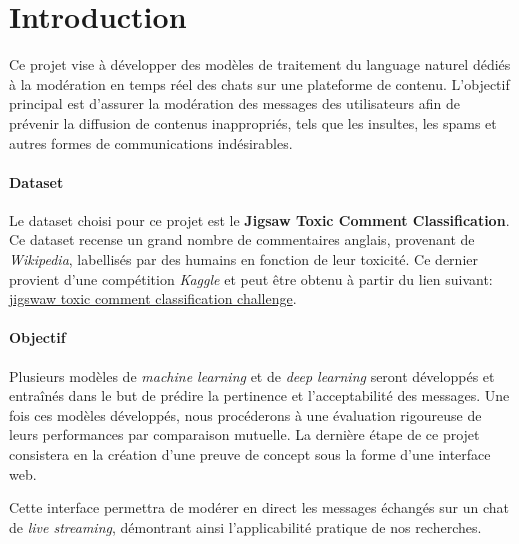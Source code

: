 
\chapter{Introduction}

Ce projet vise à développer des modèles de traitement du language naturel dédiés à la modération en temps réel des chats sur une plateforme de contenu. L'objectif principal est d'assurer la modération des messages des utilisateurs afin de prévenir la diffusion de contenus inappropriés, tels que les insultes, les spams et autres formes de communications indésirables.
\subsubsection*{Dataset} 
Le dataset choisi pour ce projet est le \textbf{Jigsaw Toxic Comment Classification}.
Ce dataset recense un grand nombre de commentaires anglais, provenant de \textit{Wikipedia}, labellisés par des humains en fonction de leur toxicité.
Ce dernier provient d'une compétition \textit{Kaggle} et peut être obtenu à partir du lien suivant: \href{https://www.kaggle.com/competitions/jigsaw-toxic-comment-classification-challenge/data}{jigswaw toxic comment classification challenge}.

\subsubsection*{Objectif}
Plusieurs modèles de \textit{machine learning} et de \textit{deep learning} seront développés et entraînés dans le but de prédire la pertinence et l'acceptabilité des messages.
Une fois ces modèles développés, nous procéderons à une évaluation rigoureuse de leurs performances par comparaison mutuelle. 
La dernière étape de ce projet consistera en la création d'une preuve de concept sous la forme d'une interface web. 

Cette interface permettra de modérer en direct les messages échangés sur un chat de \textit{live streaming}, démontrant ainsi l'applicabilité pratique de nos recherches.
